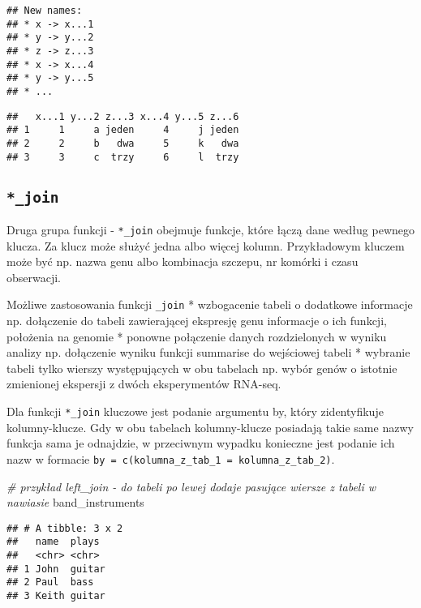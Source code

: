 \documentclass[
]{book}
\newenvironment{Shaded}{\begin{snugshade}}{\end{snugshade}}
\newcommand{\CommentTok}[1]{\textcolor[rgb]{0.56,0.35,0.01}{\textit{#1}}}
\newcommand{\NormalTok}[1]{#1}
\begin{document}
\begin{verbatim}
## New names:
## * x -> x...1
## * y -> y...2
## * z -> z...3
## * x -> x...4
## * y -> y...5
## * ...
\end{verbatim}

\begin{verbatim}
##   x...1 y...2 z...3 x...4 y...5 z...6
## 1     1     a jeden     4     j jeden
## 2     2     b   dwa     5     k   dwa
## 3     3     c  trzy     6     l  trzy
\end{verbatim}

\hypertarget{join}{%
\subsection{\texorpdfstring{\texttt{*\_join}}{*\_join}}\label{join}}

Druga grupa funkcji - \texttt{*\_join} obejmuje funkcje, które łączą dane według pewnego klucza. Za klucz może służyć jedna albo więcej kolumn. Przykładowym kluczem może być np. nazwa genu albo kombinacja szczepu, nr komórki i czasu obserwacji.

Możliwe zastosowania funkcji \texttt{\_join}
* wzbogacenie tabeli o dodatkowe informacje np. dołączenie do tabeli zawierającej ekspresję genu informacje o ich funkcji, położenia na genomie
* ponowne połączenie danych rozdzielonych w wyniku analizy np. dołączenie wyniku funkcji summarise do wejściowej tabeli
* wybranie tabeli tylko wierszy występujących w obu tabelach np. wybór genów o istotnie zmienionej ekspersji z dwóch eksperymentów RNA-seq.

Dla funkcji \texttt{*\_join} kluczowe jest podanie argumentu by, który zidentyfikuje kolumny-klucze. Gdy w obu tabelach kolumny-klucze posiadają takie same nazwy funkcja sama je odnajdzie, w przeciwnym wypadku konieczne jest podanie ich nazw w formacie \texttt{by\ =\ c(\textquotesingle{}kolumna\_z\_tab\_1\textquotesingle{}\ =\ \textquotesingle{}kolumna\_z\_tab\_2\textquotesingle{})}.

\begin{Shaded}
\begin{Highlighting}[]
\CommentTok{\# przykład left\_join {-} do tabeli po lewej dodaje pasujące wiersze z tabeli w nawiasie}
\NormalTok{band\_instruments}
\end{Highlighting}
\end{Shaded}

\begin{verbatim}
## # A tibble: 3 x 2
##   name  plays 
##   <chr> <chr> 
## 1 John  guitar
## 2 Paul  bass  
## 3 Keith guitar
\end{verbatim}
\end{document}
